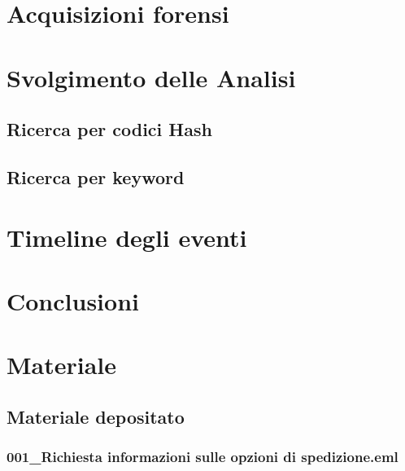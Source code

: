 \documentclass[a4paper,12pt]{report}
\begin{document}
\pagebreak

\chapter{Acquisizioni forensi}


\pagebreak

\chapter{Svolgimento delle Analisi}


\section{Ricerca per codici Hash}


\section{Ricerca per keyword}


\pagebreak

\chapter{Timeline degli eventi}





\pagebreak

\chapter{Conclusioni}


\pagebreak

\chapter{Materiale}
\section{Materiale depositato}

\subsection{001\_Richiesta informazioni sulle opzioni di spedizione.eml}
\vspace{5pt}

\end{document}
